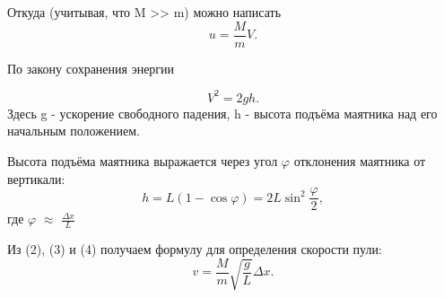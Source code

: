 \documentclass[a4paper, 12pt]{article}
\begin{document}
	Откуда (учитывая, что M >> m) можно написать
	\begin{equation}
		u = \frac{M}{m}V.
	\end{equation}
	
	По закону сохранения энергии
	
	\begin{equation}
		V^2 = 2gh.
	\end{equation}
	Здесь g - ускорение свободного падения, h - высота подъёма маятника над его начальным положением.
	
	Высота подъёма маятника выражается через угол $\varphi$ отклонения маятника от вертикали:
	\begin{equation}
		h = L(1 - \cos{\varphi}) = 2L\sin^2{\frac{\varphi}{2}},
	\end{equation}
	где $\varphi$ $\approx$ $\frac{\Delta x}{L}$
	
	Из (2), (3) и (4) получаем формулу для определения скорости пули:
	\begin{equation}
		v = \frac{M}{m}\sqrt{\frac{g}{L}}\Delta x.
	\end{equation}
	
\end{document}
